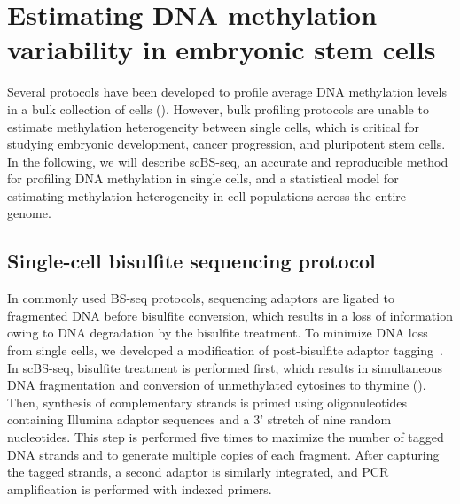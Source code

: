 \section{Estimating DNA methylation variability in embryonic stem cells} \label{sec:bs}

\ifpdf
    \graphicspath{{Chapter3/bs/Figs/Raster/}{Chapter3/bs/Figs/PDF/}{Chapter3/bs/Figs/}}
\else
    \graphicspath{{Chapter3/bs/Figs/Vector/}{Chapter3/bs/Figs/}}
\fi

Several protocols have been developed to profile average DNA methylation levels in a bulk collection of cells (). However, bulk profiling protocols are unable to estimate methylation heterogeneity between single cells, which is critical for studying embryonic development, cancer progression, and pluripotent stem cells. In the following, we will describe scBS-seq, an accurate and reproducible method for profiling DNA methylation in single cells, and a statistical model for estimating methylation heterogeneity in cell populations across the entire genome.


\subsection{Single-cell bisulfite sequencing protocol} \label{sec:bs_proto}

In commonly used BS-seq protocols, sequencing adaptors are ligated to fragmented DNA before bisulfite conversion, which results in a loss of information owing to DNA degradation by the bisulfite treatment. To minimize DNA loss from single cells, we developed a modification of post-bisulfite adaptor tagging~\citep{miura_amplification-free_2012-1}. In scBS-seq, bisulfite treatment is performed first, which results in simultaneous DNA fragmentation and conversion of unmethylated cytosines to thymine (). Then, synthesis of complementary strands is primed using oligonuleotides containing Illumina adaptor sequences and a 3' stretch of nine random nucleotides. This step is performed five times to maximize the number of tagged DNA strands and to generate multiple copies of each fragment. After capturing the tagged strands, a second adaptor is similarly integrated, and PCR amplification is performed with indexed primers.

